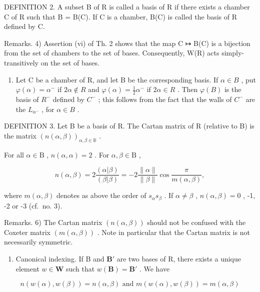DEFINITION 2. A subset B of R is called a basis of R if there exists a chamber C of R such that B = B(C). If C is a chamber, B(C) is called the basis of R defined by C.

Remarks. 4) Assertion (vi) of Th. 2 shows that the map C ↦ B(C) is a bijection from the set of chambers to the set of bases. Consequently, W(R) acts simply-transitively on the set of bases.

\begin{enumerate}
\def\labelenumi{\arabic{enumi})}
\setcounter{enumi}{4}
\tightlist
\item
  Let C be a chamber of R, and let B be the corresponding basis. If \(\alpha\in B\) , put \(\varphi(\alpha)=\alpha^{-}\) if \(2\alpha\notin R\) and \(\varphi(\alpha)=\frac{1}{2}\alpha^{-}\) if \(2\alpha\in R\) . Then \(\varphi(B)\) is the basis of \(R^{-}\) defined by \(C^{-}\) ; this follows from the fact that the walls of \(C^{-}\) are the \(L_{\alpha^{-}}\) , for \(\alpha\in B\) .
\end{enumerate}

DEFINITION 3. Let B be a basis of R. The Cartan matrix of R (relative to B) is the matrix \((n(\alpha,\beta))_{\alpha,\beta\in\mathbb{B}}\) .

For all \(\alpha \in \mathrm{B}\) , \(n(\alpha, \alpha) = 2\) . For \(\alpha, \beta \in \mathrm{B}\) ,

\[
n (\alpha , \beta) = 2 \frac {(\alpha | \beta)}{(\beta | \beta)} = - 2 \frac {\| \alpha \|}{\| \beta \|} \cos \frac {\pi}{m (\alpha , \beta)},\tag{11}
\]

where \(m(\alpha, \beta)\) denotes as above the order of \(s_{\alpha}s_{\beta}\) . If \(\alpha \neq \beta\) , \(n(\alpha, \beta) = 0\) , -1, -2 or -3 (cf.~no. 3).

Remarks. 6) The Cartan matrix \((n(\alpha,\beta))\) should not be confused with the Coxeter matrix \((m(\alpha,\beta))\) . Note in particular that the Cartan matrix is not necessarily symmetric.

\begin{enumerate}
\def\labelenumi{\arabic{enumi})}
\setcounter{enumi}{6}
\tightlist
\item
  Canonical indexing. If B and \(\mathbf{B}'\) are two bases of R, there exists a unique element \(w \in \mathbf{W}\) such that \(w(\mathbf{B}) = \mathbf{B}'\) . We have
\end{enumerate}

\[
n (w (\alpha), w (\beta)) = n (\alpha , \beta) \text { and } m (w (\alpha), w (\beta)) = m (\alpha , \beta)
\]

